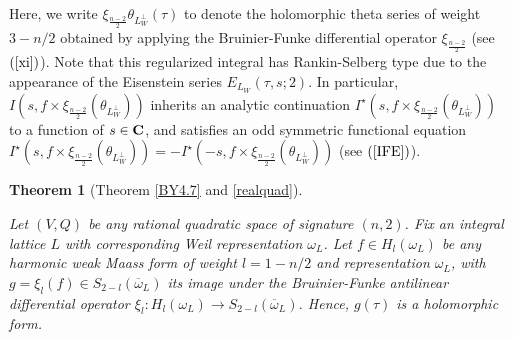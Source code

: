 \documentclass{amsart}
\newtheorem{theorem}{Theorem}[section]
\theoremstyle{definition}
\theoremstyle{definition}
\theoremstyle{definition}
\begin{document}
Here, we write $\xi_{\frac{n-2}{2}} \theta_{L_W^{\perp}}(\tau)$ to denote the holomorphic theta series of weight $3-n/2$
obtained by applying the Bruinier-Funke differential operator $\xi_{\frac{n-2}{2}}$ (see $(\ref{xi})$).
Note that this regularized integral has Rankin-Selberg type due to the appearance of the Eisenstein series $E_{L_{W}}(\tau, s; 2)$. 
In particular, $I(s, f \times \xi_{\frac{n-2}{2}}(\theta_{L_W^{\perp}}))$ inherits an analytic continuation $I^{\star}(s, f \times \xi_{\frac{n-2}{2}}(\theta_{L_W^{\perp}}))$ to a function of $s \in {\bf{C}}$,
and satisfies an odd symmetric functional equation $I^{\star}(s, f \times \xi_{\frac{n-2}{2}}(\theta_{L_W^{\perp}})) =  - I^{\star}(-s, f \times \xi_{\frac{n-2}{2}}(\theta_{L_W^{\perp}}))$ (see $(\ref{IFE})$). 

\begin{theorem}[Theorem \ref{BY4.7} and \ref{realquad}]\label{sums}

Let $(V, Q)$ be any rational quadratic space of signature $(n, 2)$. Fix an integral lattice $L$ with corresponding Weil representation $\omega_L$. 
Let $f \in H_l(\omega_L)$ be any harmonic weak Maass form of weight $l = 1-n/2$ and representation $\omega_L$, 
with $g = \xi_l(f) \in S_{2-l}(\overline{\omega}_L)$ its image under the Bruinier-Funke antilinear differential operator 
$\xi_l: H_l(\omega_L) \rightarrow S_{2-l}(\overline{\omega}_L)$. Hence, $g(\tau)$ is a holomorphic form.

\begin{itemize}


\end{itemize}
\end{theorem}
\end{document}
